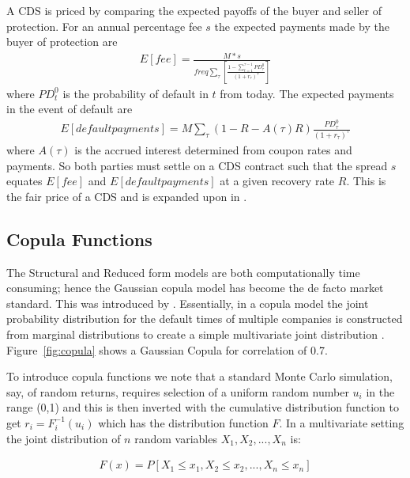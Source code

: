 A CDS is priced by comparing the expected payoffs of the buyer and seller of protection. For an annual percentage fee $s$ the expected payments made by the buyer of protection are
\begin{align}
E \left[ fee \right] = \frac{M * s}{freq \sum_\tau \left[ \frac{1 - \sum_{t=1}^{\tau-1} PD^0_\tau }{(1 + r_\tau)^\tau } \right]}
\end{align} 
where $PD^0_t$ is the probability of default in $t$ from today.  The expected payments in the event of default are
\begin{align}
E \left[ default payments \right] = M \sum_\tau ( 1 - R - A(\tau) R) \frac{PD^0_\tau}{(1 + r_\tau)^\tau}
\end{align} 
where $A(\tau)$ is the accrued interest determined from coupon rates and payments.  So both parties must settle on a CDS contract such that the spread $s$ equates $E[fee]$ and $E[default payments]$ at a given recovery rate $R$. This is the fair price of a CDS and is expanded upon in {\cite{cs2003,jt1995,Amm2002,Schm2003}}.

\subsection{Copula Functions}

The Structural and Reduced form models are both computationally time consuming; hence the Gaussian copula model has become the de facto market standard. This was introduced by \cite{Li2000}.  Essentially, in a copula model the joint probability distribution for the default times of multiple companies is constructed from marginal distributions to create a simple multivariate joint distribution \cite{hw2004}. Figure~\ref{fig:copula} shows a Gaussian Copula for correlation of 0.7.

To introduce copula functions we note that a standard Monte Carlo simulation, say, of random returns, requires selection of a uniform random number $u_i$ in the range (0,1) and this is then inverted with the cumulative distribution function to get $r_i = F^{-1}_i (u_i)$ \cite{SM2005} which has the distribution function $F$.  In a multivariate setting the joint distribution of $n$ random variables $X_1, X_2, ..., X_n$ is:

\begin{align}
F(x) = P[X_1 \leq x_1, X_2 \leq x_2, ..., X_n \leq x_n]  \nonumber
\end{align}

